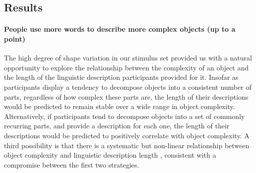 \documentclass[10pt,letterpaper]{article}
\begin{document}
\subsection{Results}

\paragraph{People use more words to describe more complex objects (up to a point)}
The high degree of shape variation in our stimulus set provided us with a natural opportunity to explore the relationship between the complexity of an object and the length of the linguistic description participants provided for it.
Insofar as participants display a tendency to decompose objects into a consistent number of parts, regardless of how complex these parts are, the length of their descriptions would be predicted to remain stable over a wide range in object complexity. 
Alternatively, if participants tend to decompose objects into a set of commonly recurring parts, and provide a description for each one, the length of their descriptions would be predicted to positively correlate with object complexity. 
A third possibility is that there is a systematic but non-linear relationship between object complexity and linguistic description length \cite{sun2021seeing}, consistent with a compromise between the first two strategies. 
\end{document}
